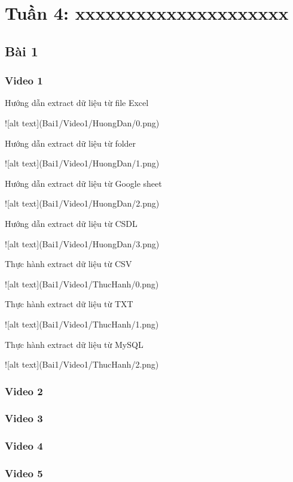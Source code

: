\documentclass{article}
\begin{document}
\tableofcontents
\newpage
\listoffigures
\newpage
\section{Tuần 4: xxxxxxxxxxxxxxxxxxxxx}
\subsection{Bài 1}
\subsubsection{Video 1}

\caption{Hướng dẫn extract dữ liệu từ file Excel}
![alt text](Bai1/Video1/HuongDan/0.png)
\caption{Hướng dẫn extract dữ liệu từ folder}
![alt text](Bai1/Video1/HuongDan/1.png)
\caption{Hướng dẫn extract dữ liệu từ Google sheet}
![alt text](Bai1/Video1/HuongDan/2.png)
\caption{Hướng dẫn extract dữ liệu từ CSDL}
![alt text](Bai1/Video1/HuongDan/3.png)

\caption{Thực hành extract dữ liệu từ CSV}
![alt text](Bai1/Video1/ThucHanh/0.png)
\caption{Thực hành extract dữ liệu từ TXT}
![alt text](Bai1/Video1/ThucHanh/1.png)
\caption{Thực hành extract dữ liệu từ MySQL}
![alt text](Bai1/Video1/ThucHanh/2.png)
\subsubsection{Video 2}

\subsubsection{Video 3}

\subsubsection{Video 4}

\subsubsection{Video 5}
\end{document}
